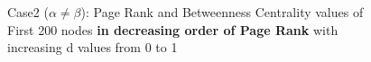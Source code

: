 \documentclass{article}
\begin{document}
\begin{enumerate}
\begin{figure}[!hbtp]
\hfill
{}
\hfill
{}
\hfill
\caption{
\label{case2rankplotPR}%
Case2 ($\alpha \neq \beta$): Page Rank and Betweenness Centrality values of First 200 nodes \textbf{in decreasing order of Page Rank} with increasing d values from 0 to 1
}
\end{figure}


\end{enumerate}
\end{document}
